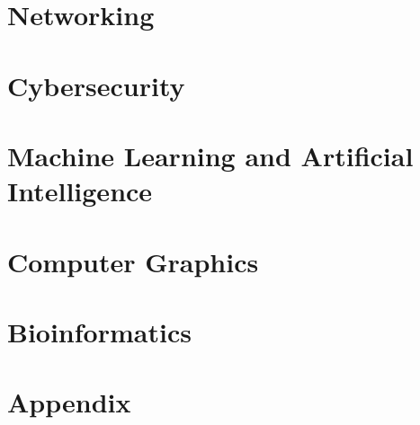 \documentclass[11pt,twoside=semi,openright,numbers=noenddot,titlepage=false]{scrbook}
\begin{document}
\part{Networking}\label{part:networking}
\parttoc{}
% 
% 
% 
% 
% 
% 


\part{Cybersecurity}\label{part:cybersec}
\parttoc{}
% 
% 
% 
% 
% 
% 
% 


\part{Machine Learning and Artificial Intelligence}\label{part:ai}
\parttoc{}
% 
% 
% 
% 
% 
% 
% 


\part{Computer Graphics}\label{part:graphics}
\parttoc{}
% 
% 
% 
% 
% 


\part{Bioinformatics}\label{part:bioinformatics}
\parttoc{}
% 
% 
% 
% 



\part{Appendix}
\parttoc{}
\appendix




%

%

\backmatter{}

\clearpage
\printbibliography[type=image,title={Image Attributions}]
\printbibliography[nottype=image]
\end{document}
